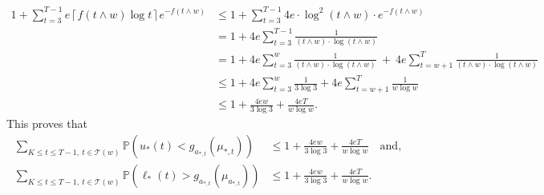 \documentclass[letterpaper]{article} %
\newcommand{\optArm}[1]{a_{*, #1}}
\newcommand{\optMean}[1]{\mu_{*, #1}}
\newcommand{\noChange}{\mathcal{T}}
\newcommand{\windowsize}{w}
\begin{document}
\begin{align*}
1 + \sum_{t = 3}^{T-1} e \left \lceil f\left( t \wedge \windowsize \right) \log{t} \right \rceil e^{-f\left( t \wedge \windowsize\right)} & \leq 
 1 + \sum_{t = 3}^{T-1} 4e \cdot \log^2 \left({t \wedge \windowsize}\right) \cdot e^{-f(t \wedge \windowsize)} \nonumber \\
&= 1 + 4e\sum_{t = 3}^{T-1} \frac{1}{(t \wedge \windowsize) \cdot  \log{(t \wedge \windowsize)}} \nonumber \\
&= 1 + 4e\sum_{t = 3}^{\windowsize} \frac{1}{(t \wedge \windowsize) \cdot  \log{(t \wedge \windowsize)}}  \ + \ 4e\sum_{t = \windowsize+1}^{T} \frac{1}{(t \wedge \windowsize) \cdot  \log{(t \wedge \windowsize)}}  \nonumber \\
&\leq 1 + 4e\sum_{t = 3}^{\windowsize} \frac{1}{ 3 \log{3}} + 4e\sum_{t = \windowsize+1}^{T} \frac{1}{ \windowsize \log{\windowsize}}  \nonumber \\
&\leq 1 + \frac{4 e \windowsize}{3 \log{3}} + \frac{4 e T}{\windowsize \log{\windowsize}}.
\end{align*}
This proves that 
\begin{align}
\sum_{K \leq t \leq T-1, \ t \in \noChange(\windowsize)} \mathds{P}\left(u_*(t) < g_{\optArm{t}}(\optMean{t})\right) &\leq  1 + \frac{4 e \windowsize}{3 \log{3}} + \frac{4 e T}{\windowsize \log{\windowsize}} \quad \text{and},\label{term1a} \\
\sum_{K \leq t \leq T-1, \ t \in \noChange(\windowsize)} \mathds{P}\left(\ell_*(t) > g_{\optArm{t}}(\mu_{\optArm{t}})\right) &\leq 1 + \frac{4 e \windowsize}{3 \log{3}} + \frac{4 e T}{\windowsize \log{\windowsize}} \label{term1b}.
\end{align}
\end{document}
